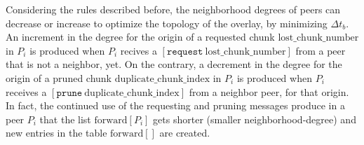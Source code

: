 Considering the rules described before, the neighborhood degrees of
peers can decrease or increase to optimize the topology of the
overlay, by minimizing $\Delta t_b$. An increment in the degree for the origin of a requested
chunk $\text{lost\_chunk\_number}$ in $P_i$ is produced when $P_i$
recives a $[\mathtt{request}~\text{lost\_chunk\_number}]$ from a peer
that is not a neighbor, yet. On the contrary, a decrement in the
degree for the origin of a pruned chunk
$\text{duplicate\_chunk\_index}$ in $P_i$ is produced when $P_i$
receives a $[\mathtt{prune}~\text{duplicate\_chunk\_index}]$ from a
neighbor peer, for that origin. In fact, the continued use of the
requesting and pruning messages produce in a peer $P_i$ that the list
$\text{forward}[P_i]$ gets shorter (smaller \gls{neighborhood-degree})
and new entries in the table $\text{forward}[]$ are created.

